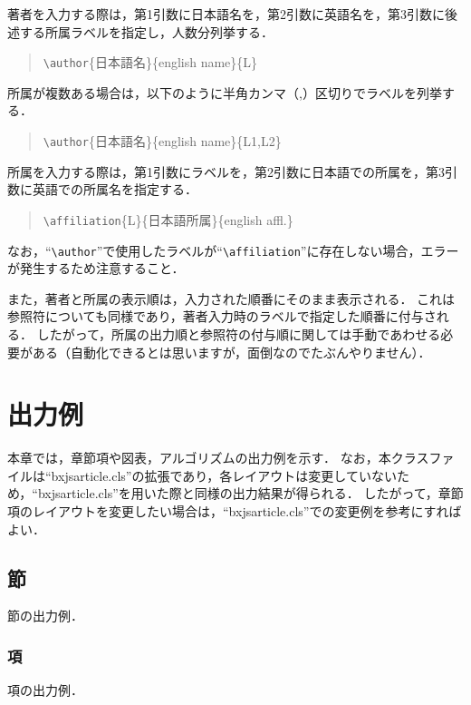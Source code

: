 \documentclass{ipsj}
\theoremstyle{definition}
\begin{document}
著者を入力する際は，第1引数に日本語名を，第2引数に英語名を，第3引数に後述する所属ラベルを指定し，人数分列挙する．
\begin{quote}
  \texttt{\textbackslash author}\{日本語名\}\{english name\}\{L\}
\end{quote}
所属が複数ある場合は，以下のように半角カンマ（,）区切りでラベルを列挙する．
\begin{quote}
  \texttt{\textbackslash author}\{日本語名\}\{english name\}\{L1,L2\}
\end{quote}

所属を入力する際は，第1引数にラベルを，第2引数に日本語での所属を，第3引数に英語での所属名を指定する．
\begin{quote}
  \texttt{\textbackslash affiliation}\{L\}\{日本語所属\}\{english affl.\}
\end{quote}
なお，``\texttt{\textbackslash author}''で使用したラベルが``\texttt{\textbackslash affiliation}''に存在しない場合，エラーが発生するため注意すること．

また，著者と所属の表示順は，入力された順番にそのまま表示される．
これは参照符についても同様であり，著者入力時のラベルで指定した順番に付与される．
したがって，所属の出力順と参照符の付与順に関しては手動であわせる必要がある（自動化できるとは思いますが，面倒なのでたぶんやりません）．





\section{出力例}

本章では，章節項や図表，アルゴリズムの出力例を示す．
なお，本クラスファイルは``bxjsarticle.cls''の拡張であり，各レイアウトは変更していないため，``bxjsarticle.cls''を用いた際と同様の出力結果が得られる．
したがって，章節項のレイアウトを変更したい場合は，``bxjsarticle.cls''での変更例を参考にすればよい．



\subsection{節}

節の出力例．


\subsubsection{項}

項の出力例．
\end{document}
